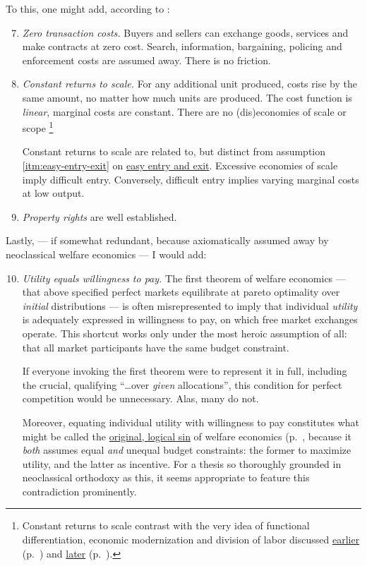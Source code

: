 To this, one might add, according to \citeauthor{Wikipedia2012}:
\begin{enumerate} \setcounter{enumi}{6}
	\item \emph{Zero transaction costs.} \label{itm:zero-transaction-costs}
		Buyers and sellers can exchange goods, services and make contracts at zero cost. 
		Search, information, bargaining, policing and enforcement costs are assumed away. 
		There is no friction.
	\item \emph{Constant returns to scale.} \label{itm:constant-returns-to-scale} 
		For any additional unit produced, costs rise by the same amount, no matter how much units are produced. 
		The cost function is \emph{linear}, marginal costs are constant. 
		There are no (dis)economies of scale or scope 
		\footnote{
			Constant returns to scale contrast with the very idea of functional differentiation, economic modernization and division of labor discussed \hyperref[sec:modernity]{earlier} (p.~\pageref{sec:modernity}) and \hyperref[sec:growth-solidarity]{later} (p.~\pageref{sec:growth-solidarity}).
		}
		
		Constant returns to scale are related to, but distinct from assumption \ref{itm:easy-entry-exit} on \hyperref[itm:easy-entry-exit]{easy entry and exit}. 
		Excessive economies of scale imply difficult entry. 
		Conversely, difficult entry implies varying marginal costs at low output.
	\item \emph{Property rights} \label{itm:property-rights} are well established. 
\end{enumerate}

Lastly, --- if somewhat redundant, because axiomatically assumed away by neoclassical welfare economics --- I would add:

\begin{enumerate}\setcounter{enumi}{9}
	\item \emph{Utility equals willingness to pay.} \label{itm:same-budgets}
	The first theorem of welfare economics --- that above specified perfect markets equilibrate at pareto optimality over \emph{initial} distributions --- is often misrepresented to imply that individual \emph{utility} is adequately expressed in willingness to pay, on which free market exchanges operate. 
	This shortcut works only under the most heroic assumption of all: that all market participants have the same budget constraint.
	
	If everyone invoking the first theorem were to represent it in full, including the crucial, qualifying ``\ldots over \emph{given} allocations'', this condition for perfect competition would be unnecessary. 
	Alas, many do not.
	
	Moreover, equating individual utility with willingness to pay constitutes what might be called the \hyperref[sec:different-budget-constraints]{original, logical sin} of welfare economics (p.~\pageref{sec:different-budget-constraints}, because it \emph{both} assumes equal \emph{and} unequal budget constraints: the former to maximize utility, and the latter as incentive. 
	For a thesis so thoroughly grounded in neoclassical orthodoxy as this, it seems appropriate to feature this contradiction prominently.
\end{enumerate}

